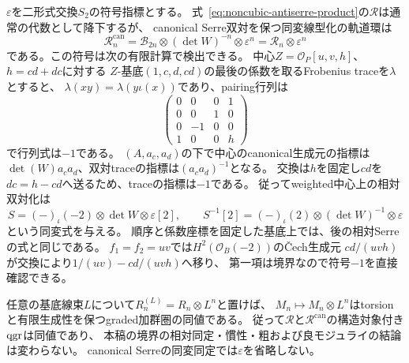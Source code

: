 \begin{remark}[canonical同変反Serre環の交換指標]
\label{rem:noncubic-equivariant-antiserre-sign}
$\varepsilon$を二形式交換$S_2$の符号指標とする。
式~\eqref{eq:noncubic-antiserre-product}の$\mathcal R$は通常の代数として降下するが、
canonical Serre双対を保つ同変線型化の軌道環は
\[
 \mathcal R^{\mathrm{can}}_n
   =\mathcal B_{2n}\otimes(\det W)^{-n}\otimes\varepsilon^n
   =\mathcal R_n\otimes\varepsilon^n
\]
である。この符号は次の有限計算で検出できる。
中心$Z=\mathcal O_P[u,v,h]$、$h=cd+dc$に対する
$Z$-基底$(1,c,d,cd)$の最後の係数を取るFrobenius traceを$\lambda$とすると、
$\lambda(xy)=\lambda(y\iota(x))$であり、pairing行列は
\[
 \begin{pmatrix}0&0&0&1\\0&0&1&0\\0&-1&0&0\\1&0&0&h\end{pmatrix}
\]
で行列式は$-1$である。
$(A,a_c,a_d)$の下で中心のcanonical生成元の指標は
$\det(W)a_ca_d$、双対traceの指標は$(a_ca_d)^{-1}$となる。
交換は$h$を固定し$cd$を$dc=h-cd$へ送るため、traceの指標は$-1$である。
従ってweighted中心上の相対双対化は
\[
 S=(-)_\iota(-2)\otimes\det W\otimes\varepsilon[2],\qquad
 S^{-1}[2]=(-)_\iota(2)\otimes(\det W)^{-1}\otimes\varepsilon
\]
という同変式を与える。
順序と係数座標を固定した基底上では、後の相対Serreの式と同じである。
$f_1=f_2=uv$では$H^2(\mathcal O_B(-2))$の\v{C}ech生成元
$cd/(uvh)$が交換により$1/(uv)-cd/(uvh)$へ移り、
第一項は境界なので符号$-1$を直接確認できる。

任意の基底線束$L$について$R^{(L)}_n=R_n\otimes L^n$と置けば、
$M_n\mapsto M_n\otimes L^n$はtorsionと有限生成性を保つgraded加群圏の同値である。
従って$\mathcal R$と$\mathcal R^{\mathrm{can}}$の構造対象付き$\operatorname{qgr}$は同値であり、
本稿の境界の相対同定・慣性・粗および良モジュライの結論は変わらない。
canonical Serreの同変同定では$\varepsilon$を省略しない。
\end{remark}


